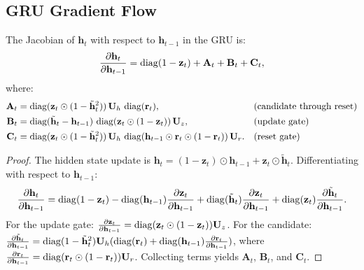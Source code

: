 \documentclass[11pt,a4paper]{article}
\begin{document}
\subsection{GRU Gradient Flow}

\begin{theorem}
\label{thm:gru-jacobian}
The Jacobian of $\mathbf{h}_t$ with respect to $\mathbf{h}_{t-1}$
in the GRU is:
\begin{equation}
  \frac{\partial \mathbf{h}_t}{\partial \mathbf{h}_{t-1}}
    = \operatorname{diag}(1 - \mathbf{z}_t) + \mathbf{A}_t + \mathbf{B}_t
      + \mathbf{C}_t,
  \label{eq:gru-jacobian}
\end{equation}
where:
\begin{align*}
  \mathbf{A}_t &= \operatorname{diag}(\mathbf{z}_t \odot
    (1 - \tilde{\mathbf{h}}_t^2)) \, \mathbf{U}_h \,
    \operatorname{diag}(\mathbf{r}_t),
    && \text{(candidate through reset)} \\
  \mathbf{B}_t &= \operatorname{diag}(\tilde{\mathbf{h}}_t - \mathbf{h}_{t-1})
    \, \operatorname{diag}(\mathbf{z}_t \odot (1 - \mathbf{z}_t)) \,
    \mathbf{U}_z,
    && \text{(update gate)} \\
  \mathbf{C}_t &= \operatorname{diag}(\mathbf{z}_t \odot
    (1 - \tilde{\mathbf{h}}_t^2)) \, \mathbf{U}_h \,
    \operatorname{diag}(\mathbf{h}_{t-1} \odot \mathbf{r}_t \odot
    (1 - \mathbf{r}_t)) \, \mathbf{U}_r.
    && \text{(reset gate)}
\end{align*}
\end{theorem}

\begin{proof}
The hidden state update is $\mathbf{h}_t = (1 - \mathbf{z}_t) \odot
\mathbf{h}_{t-1} + \mathbf{z}_t \odot \tilde{\mathbf{h}}_t$.
Differentiating with respect to $\mathbf{h}_{t-1}$:
\[
  \frac{\partial \mathbf{h}_t}{\partial \mathbf{h}_{t-1}}
    = \operatorname{diag}(1 - \mathbf{z}_t)
    - \operatorname{diag}(\mathbf{h}_{t-1}) \frac{\partial \mathbf{z}_t}
      {\partial \mathbf{h}_{t-1}}
    + \operatorname{diag}(\tilde{\mathbf{h}}_t) \frac{\partial \mathbf{z}_t}
      {\partial \mathbf{h}_{t-1}}
    + \operatorname{diag}(\mathbf{z}_t) \frac{\partial \tilde{\mathbf{h}}_t}
      {\partial \mathbf{h}_{t-1}}.
\]
For the update gate: $\frac{\partial \mathbf{z}_t}
{\partial \mathbf{h}_{t-1}} = \operatorname{diag}(\mathbf{z}_t \odot
(1 - \mathbf{z}_t)) \mathbf{U}_z$.
For the candidate:
$\frac{\partial \tilde{\mathbf{h}}_t}{\partial \mathbf{h}_{t-1}}
= \operatorname{diag}(1 - \tilde{\mathbf{h}}_t^2) \mathbf{U}_h
(\operatorname{diag}(\mathbf{r}_t) + \operatorname{diag}(\mathbf{h}_{t-1})
\frac{\partial \mathbf{r}_t}{\partial \mathbf{h}_{t-1}})$,
where $\frac{\partial \mathbf{r}_t}{\partial \mathbf{h}_{t-1}} =
\operatorname{diag}(\mathbf{r}_t \odot (1 - \mathbf{r}_t)) \mathbf{U}_r$.
Collecting terms yields $\mathbf{A}_t$, $\mathbf{B}_t$, and
$\mathbf{C}_t$.
\end{proof}
\end{document}
